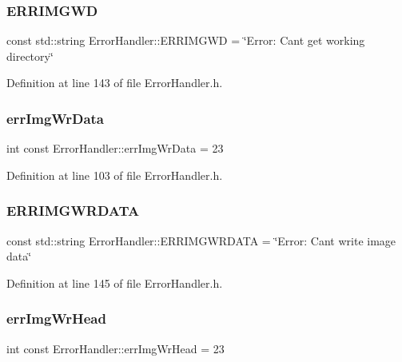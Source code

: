 \subsubsection{\texorpdfstring{ERRIMGWD}{ERRIMGWD}}
{\footnotesize\ttfamily const std\+::string Error\+Handler\+::\+E\+R\+R\+I\+M\+G\+WD = \char`\"{}Error\+: Can\textquotesingle{}t get working directory\char`\"{}\hspace{0.3cm}{\ttfamily [static]}}



Definition at line 143 of file Error\+Handler.\+h.

\mbox{\label{classErrorHandler_a5f37588aedcbd44ec5b33f16dd35a01e}} 
\subsubsection{\texorpdfstring{errImgWrData}{errImgWrData}}
{\footnotesize\ttfamily int const Error\+Handler\+::err\+Img\+Wr\+Data = 23\hspace{0.3cm}{\ttfamily [static]}}



Definition at line 103 of file Error\+Handler.\+h.

\mbox{\label{classErrorHandler_afc2c1377f8cee14dac495c98323b02f1}} 
\subsubsection{\texorpdfstring{ERRIMGWRDATA}{ERRIMGWRDATA}}
{\footnotesize\ttfamily const std\+::string Error\+Handler\+::\+E\+R\+R\+I\+M\+G\+W\+R\+D\+A\+TA = \char`\"{}Error\+: Can\textquotesingle{}t write image data\char`\"{}\hspace{0.3cm}{\ttfamily [static]}}



Definition at line 145 of file Error\+Handler.\+h.

\mbox{\label{classErrorHandler_a76194049ce9812eacb553724e5c1d78c}} 
\subsubsection{\texorpdfstring{errImgWrHead}{errImgWrHead}}
{\footnotesize\ttfamily int const Error\+Handler\+::err\+Img\+Wr\+Head = 23\hspace{0.3cm}{\ttfamily [static]}}



